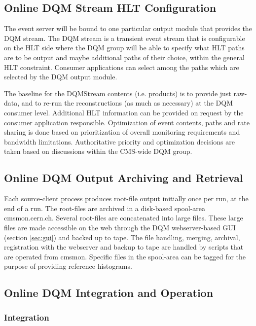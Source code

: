 \subsection{Online DQM Stream HLT Configuration}

The event server will be bound to one particular output module that provides the DQM stream.
The DQM stream is a transient event stream that is configurable on the HLT side where the DQM group will be able to specify what HLT paths are to be output and maybe additional paths of their choice, within the general HLT constraint.
Consumer applications can select among the paths which are selected by the DQM output module.

The baseline for the DQMStream contents (i.e. products) is to provide
just raw-data, and to re-run the reconstructions (as much as necessary)
at the DQM consumer level. Additional HLT information can be provided
on request by the consumer application responsible. Optimization of 
event contents, paths and rate sharing is done based on prioritization 
of overall monitoring requirements and bandwidth limitations.
Authoritative priority and optimization decisions are taken based on
discussions within the CMS-wide DQM group.

\subsection{Online DQM Output Archiving and Retrieval}

Each source-client process produces root-file output initially once per run, at the end of a run. 
The root-files are archived in a disk-based spool-area cmsmon.cern.ch.
Several root-files are concatenated into large files. These large
files are made accessible on the web through the DQM webserver-based 
GUI (section \ref{sec:gui}) and backed up to tape. The file handling,
merging, archival, registration with the webserver and backup to tape
are handled by scripts that are operated from cmsmon.
Specific files in the spool-area can be tagged for the purpose of 
providing reference histograms. 

\subsection{Online DQM Integration and Operation}

\subsubsection*{Integration}

